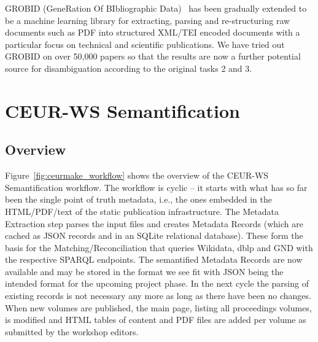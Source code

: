 \documentclass[]{ceurart}
\begin{document}
GROBID (GeneRation Of BIbliographic Data)~\cite{Lopez_2009} has been gradually extended to be a machine learning library for extracting, parsing and re-structuring raw documents such as PDF into structured XML/TEI encoded documents with a particular focus on technical and scientific publications. We have tried out GROBID on over 50,000 papers so that the results are now a further potential source for disambiguation according to the original tasks 2 and 3.

\section{CEUR-WS Semantification}\label{sec:Semantification}

\subsection{Overview}\label{sec:sem_overview}
Figure~\ref{fig:ceurmake_workflow} shows the overview of the CEUR-WS Semantification workflow.
The workflow is cyclic -- it starts with what has so far been the single point of truth metadata, i.e., the ones embedded in the HTML/PDF/text of the static publication infrastructure. The Metadata Extraction step parses the input files and creates Metadata Records (which are cached as JSON records and in an SQLite relational database). These form the basis for the Matching/Reconciliation that queries Wikidata, dblp and GND with the respective SPARQL endpoints. The semantified Metadata Records are now available and may be stored in the format we see fit with JSON being the intended format for the upcoming project phase. In the next cycle the parsing of existing records is not necessary any more as long as there have been no changes. When new volumes are published, the main page, listing all proceedings volumes, is modified and HTML tables of content and PDF files are added per volume as submitted by the workshop editors.  

\end{document}
